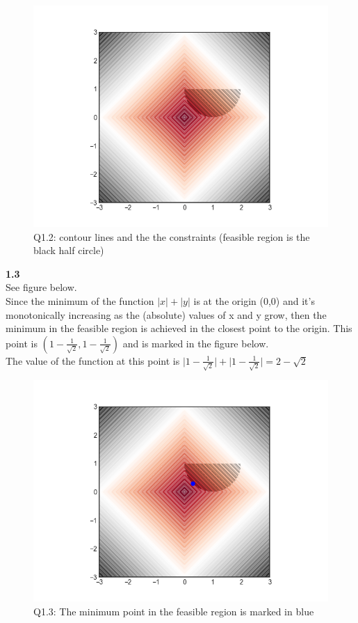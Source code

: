 \documentclass[fleqn]{article}
\begin{document}
\begin{figure}[h!]
\includegraphics[width=0.8\linewidth]{q1_2.PNG}
\caption{Q1.2: contour lines and the the constraints (feasible region is the black half circle)}
\end{figure}

\textbf{1.3} \\
See figure below. \\

Since the minimum of the function  $\lvert x\rvert +\lvert y \rvert $ is at the origin (0,0) and it's monotonically increasing as the (absolute) values of x and y grow, then the minimum in the feasible region is achieved in the closest point to the origin. This point is $(1-\frac{1}{\sqrt{2}}, 1-\frac{1}{\sqrt{2}})$ and is marked in the figure below.\\

The value of the function at this point is $\lvert 1-\frac{1}{\sqrt{2}} \rvert + \lvert1-\frac{1}{\sqrt{2}}\rvert = 2 - \sqrt{2}$\\

\begin{figure}[h!]
\includegraphics[width=0.8\linewidth]{q1_3.PNG}
\caption{Q1.3: The minimum point in the feasible region is marked in blue}
\end{figure}
\end{document}
